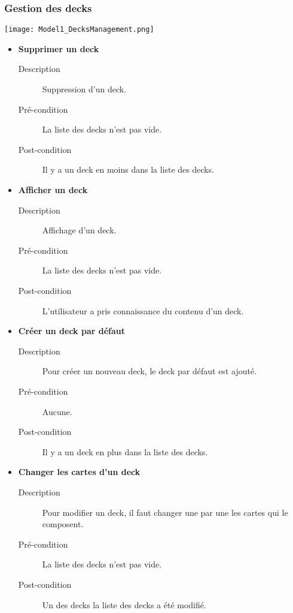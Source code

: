 \documentclass{article}
\begin{document}
		\subsubsection{Gestion des \glspl{deck}}
			\begin{center}\texttt{[image: Model1\_DecksManagement.png]}\end{center}
			\begin{itemize}
				\item \textbf{Supprimer un deck}
				\begin{description}
					\item[Description] Suppression d'un deck.
					\item[Pré-condition] La liste des decks n'est pas vide.
					\item[Post-condition] Il y a un deck en moins dans la liste des decks.\\
				\end{description}

				\item \textbf{Afficher un deck}
				\begin{description}
					\item[Description] Affichage d'un deck.
					\item[Pré-condition] La liste des decks n'est pas vide.
					\item[Post-condition] L'utilisateur a pris connaissance du contenu d'un deck.\\
				\end{description}

				\item \textbf{Créer un deck par défaut}
				\begin{description}
					\item[Description] Pour créer un nouveau deck, le deck par défaut est ajouté.
					\item[Pré-condition] Aucune.
					\item[Post-condition] Il y a un deck en plus dans la liste des decks.\\
				\end{description}

				\item \textbf{Changer les cartes d'un deck}
				\begin{description}
					\item[Description] Pour modifier un deck, il faut changer une par une les cartes qui le composent.
					\item[Pré-condition] La liste des decks n'est pas vide.
					\item[Post-condition] Un des decks la liste des decks a été modifié.\\
				\end{description}
			\end{itemize}
\end{document}
